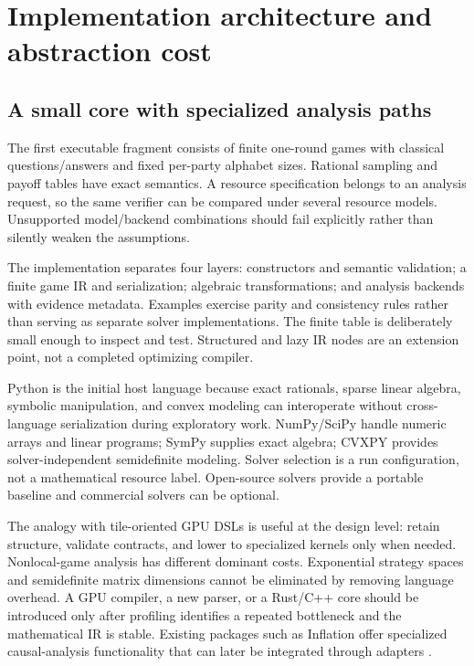 \section{Implementation architecture and abstraction cost}
\label{sec:architecture}

\subsection{A small core with specialized analysis paths}
The first executable fragment consists of finite one-round games with
classical questions/answers and fixed per-party alphabet sizes. Rational
sampling and payoff tables have exact semantics. A resource specification
belongs to an analysis request, so the same verifier can be compared under
several resource models. Unsupported model/backend combinations should fail
explicitly rather than silently weaken the assumptions.

The implementation separates four layers: constructors and semantic
validation; a finite game IR and serialization; algebraic transformations;
and analysis backends with evidence metadata. Examples exercise parity and
consistency rules rather than serving as separate solver implementations.
The finite table is deliberately small enough to inspect and test. Structured
and lazy IR nodes are an extension point, not a completed optimizing compiler.

Python is the initial host language because exact rationals, sparse linear
algebra, symbolic manipulation, and convex modeling can interoperate without
cross-language serialization during exploratory work. NumPy/SciPy handle
numeric arrays and linear programs; SymPy supplies exact algebra; CVXPY
provides solver-independent semidefinite modeling. Solver selection is a run
configuration, not a mathematical resource label. Open-source solvers provide
a portable baseline and commercial solvers can be optional.

The analogy with tile-oriented GPU DSLs is useful at the design level: retain
structure, validate contracts, and lower to specialized kernels only when
needed. Nonlocal-game analysis has different dominant costs. Exponential
strategy spaces and semidefinite matrix dimensions cannot be eliminated by
removing language overhead. A GPU compiler, a new parser, or a Rust/C++ core
should be introduced only after profiling identifies a repeated bottleneck
and the mathematical IR is stable. Existing packages such as Inflation offer
specialized causal-analysis functionality that can later be integrated
through adapters \cite{boghiu2023}.

